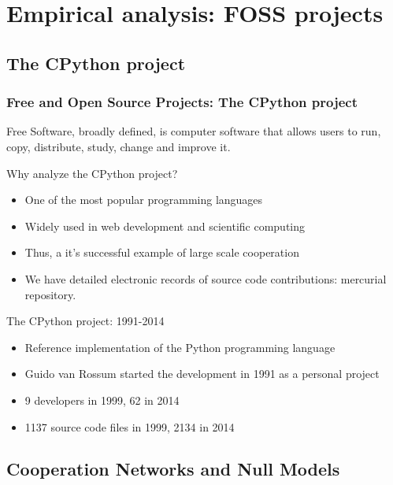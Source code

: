 \documentclass[ignorenonframetext,red,8pt,notes=hide]{beamer}
\begin{document}
\section{Empirical analysis: FOSS projects}

\subsection{The CPython project}

\begin{frame}
\frametitle{Free and Open Source Projects: The CPython project}

Free Software, broadly defined, is computer software that allows users to run, copy, distribute, study, change and improve it.

\begin{block}{Why analyze the CPython project?}
\begin{itemize}
\item One of the most popular programming languages
\item Widely used in web development and scientific computing
\item Thus, a it's successful example of large scale cooperation
\item We have detailed electronic records of source code contributions: mercurial repository.
\end{itemize}
\end{block}

\pause

\begin{block}{The CPython project: 1991-2014}
\begin{itemize}
\item Reference implementation of the Python programming language
\item Guido van Rossum started the development in 1991 as a personal project
\item 9 developers in 1999, 62 in 2014
\item 1137 source code files in 1999, 2134 in 2014
\end{itemize}
\end{block}


\end{frame}

\subsection{Cooperation Networks and Null Models}
\end{document}
